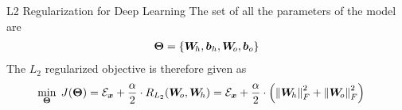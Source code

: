 \begin{frame}{L2 Regularization for Deep Learning}
%
%
The set of all the parameters of the model are 
\begin{align*}
    {\bm \Theta} = \left\{ {\boldsymbol W}_{\!h}, {\boldsymbol b}_{h}, {\boldsymbol W}_{\!o},
    {\boldsymbol b}_{o}\right\}
\end{align*}
The $L_2$ regularized objective is therefore given as
\begin{align*}
    \min_{{\bm \Theta}} \; J({\bm \Theta}) & =  {\mathcal E}_{{\boldsymbol x}} + \frac{\alpha}{2} \cdot
    R_{L_2}({\boldsymbol W}_{\!o}, {\boldsymbol W}_{\!h}) = 
    {\mathcal E}_{{\boldsymbol x}} +
     \frac{\alpha}{2} \cdot \left( \left\lVert{\boldsymbol W}_{\!h}\right\rVert_{F}^2 + \left\lVert{\boldsymbol W}_{\!o}\right\rVert_{F}^2
    \right)
\end{align*}

\end{frame}

